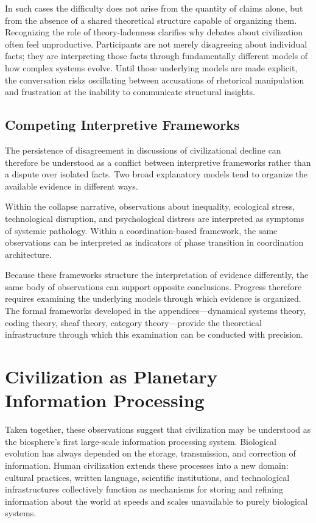 \documentclass[12pt]{article}
\begin{document}
In such cases the difficulty does not arise from the quantity of claims alone, but from the absence of a shared theoretical structure capable of organizing them. Recognizing the role of theory-ladenness clarifies why debates about civilization often feel unproductive. Participants are not merely disagreeing about individual facts; they are interpreting those facts through fundamentally different models of how complex systems evolve. Until those underlying models are made explicit, the conversation risks oscillating between accusations of rhetorical manipulation and frustration at the inability to communicate structural insights.

\subsection{Competing Interpretive Frameworks}

The persistence of disagreement in discussions of civilizational decline can therefore be understood as a conflict between interpretive frameworks rather than a dispute over isolated facts. Two broad explanatory models tend to organize the available evidence in different ways.

Within the collapse narrative, observations about inequality, ecological stress, technological disruption, and psychological distress are interpreted as symptoms of systemic pathology. Within a coordination-based framework, the same observations can be interpreted as indicators of phase transition in coordination architecture.

Because these frameworks structure the interpretation of evidence differently, the same body of observations can support opposite conclusions. Progress therefore requires examining the underlying models through which evidence is organized. The formal frameworks developed in the appendices---dynamical systems theory, coding theory, sheaf theory, category theory---provide the theoretical infrastructure through which this examination can be conducted with precision.

\section{Civilization as Planetary Information Processing}

Taken together, these observations suggest that civilization may be understood as the biosphere's first large-scale information processing system. Biological evolution has always depended on the storage, transmission, and correction of information. Human civilization extends these processes into a new domain: cultural practices, written language, scientific institutions, and technological infrastructures collectively function as mechanisms for storing and refining information about the world at speeds and scales unavailable to purely biological systems.
\end{document}
